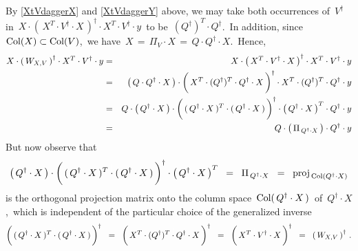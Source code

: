 \begin{enumerate}
	By \eqref{XtVdaggerX} and \eqref{XtVdaggerY} above,
	we may take both occurrences of \,$V^{\dagger}$\, in
	\,$X \cdot \left(\,X^{T} \cdot V^{\dagger} \cdot X\,\right)^{\dagger} \cdot X^{T} \cdot V^{\dagger} \cdot y$\,
	to be	 \,$(Q^{\dagger})^{T} \cdot Q^{\dagger}$.\,
	In addition, since \,$\textnormal{Col}(X) \subset \textnormal{Col}(V)$,\, we have
	\,$X \,=\, \Pi_{V} \cdot X \,=\, Q \cdot Q^{\dagger} \cdot X$.\,
	Hence,
	\begin{eqnarray*}
	X \cdot \left(\,W_{X,V}\,\right)^{\dagger} \cdot X^{T} \cdot V^{\dagger} \cdot y
	&=&
		X \cdot \left(\,X^{T} \cdot V^{\dagger} \cdot X\,\right)^{\dagger} \cdot X^{T} \cdot V^{\dagger} \cdot y
	\\
	&=&
		\left(\,Q \cdot Q^{\dagger} \cdot X\,\right)
		\cdot
		\left(\,X^{T} \cdot (Q^{\dagger})^{T} \overset{{\color{white}\vert}}{\cdot} Q^{\dagger} \cdot X\,\right)^{\dagger}
		\cdot
		X^{T} \cdot (Q^{\dagger})^{T} \cdot Q^{\dagger} \cdot y
	\\
	&=&
		Q \cdot
		\left(\,Q^{\dagger} \cdot X\,\right)
		\cdot
		\left(\,(\,Q^{\dagger} \cdot X\,)^{T} \overset{{\color{white}\vert}}{\cdot} (\,Q^{\dagger} \cdot X\,)\,\right)^{\dagger}
		\cdot
		\left(\,Q^{\dagger} \cdot X\,\right)^{T}
		\cdot
		Q^{\dagger} \cdot y
	\\
	&=&
		Q \cdot
		\left(\,\Pi_{\,Q^{\dagger} \cdot X}\,\right)
		\cdot
		Q^{\dagger} \cdot y
	\end{eqnarray*}
	But now observe that
	\begin{equation*}
	\left(\,Q^{\dagger} \cdot X\,\right)
	\cdot
	\left(\,(\,Q^{\dagger} \cdot X\,)^{T} \overset{{\color{white}\vert}}{\cdot} (\,Q^{\dagger} \cdot X\,)\,\right)^{\dagger}
	\cdot
	\left(\,Q^{\dagger} \cdot X\,\right)^{T}
	\;\; = \;\;
		\Pi_{\,Q^{\dagger} \cdot X}
	\;\; = \;\;
		\proj_{\,\Col(Q^{\dagger} \cdot X)}
	\end{equation*}
	is the orthogonal projection matrix onto the column space
	\,$\textnormal{Col}(\,Q^{\dagger} \cdot X\,)$\, of \,$Q^{\dagger} \cdot X$,\,
	which is independent of the particular choice of the generalized inverse
	\begin{equation*}
	\left(\,(\,Q^{\dagger} \cdot X\,)^{T} \overset{{\color{white}\vert}}{\cdot} (\,Q^{\dagger} \cdot X\,)\,\right)^{\dagger}
	\;\; = \;\;
	\left(\,X^{T} \cdot (Q^{\dagger})^{T} \overset{{\color{white}\vert}}{\cdot} Q^{\dagger} \cdot X\,\right)^{\dagger}
	\;\; = \;\;
	\left(\,X^{T} \overset{{\color{white}\vert}}{\cdot} V^{\dagger} \cdot X\,\right)^{\dagger}
	\;\; = \;\;
	\left(\,W_{X,V}\,\right)^{\dagger}\,.
	\end{equation*}

\end{enumerate}
